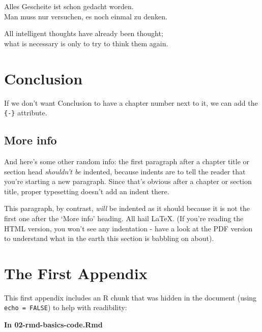 \documentclass[a4paper,nobind]{templates/ociamthesis}
\begin{document}
\begin{savequote}
Alles Gescheite ist schon gedacht worden.\\
Man muss nur versuchen, es noch einmal zu denken.

All intelligent thoughts have already been thought;\\
what is necessary is only to try to think them again.
\end{savequote}



\hypertarget{conclusion-1}{%
\chapter*{Conclusion}\label{conclusion-1}}

If we don't want Conclusion to have a chapter number next to it, we can add the \texttt{\{-\}} attribute.

\hypertarget{more-info}{%
\section*{More info}\label{more-info}}

And here's some other random info:
the first paragraph after a chapter title or section head \emph{shouldn't be} indented, because indents are to tell the reader that you're starting a new paragraph.
Since that's obvious after a chapter or section title, proper typesetting doesn't add an indent there.

This paragraph, by contrast, \emph{will} be indented as it should because it is not the first one after the `More info' heading.
All hail LaTeX. (If you're reading the HTML version, you won't see any indentation - have a look at the PDF version to understand what in the earth this section is babbling on about).

\startappendices

\hypertarget{the-first-appendix}{%
\chapter{The First Appendix}\label{the-first-appendix}}

This first appendix includes an R chunk that was hidden in the document (using \texttt{echo\ =\ FALSE}) to help with readibility:

\textbf{In 02-rmd-basics-code.Rmd}
\end{document}
